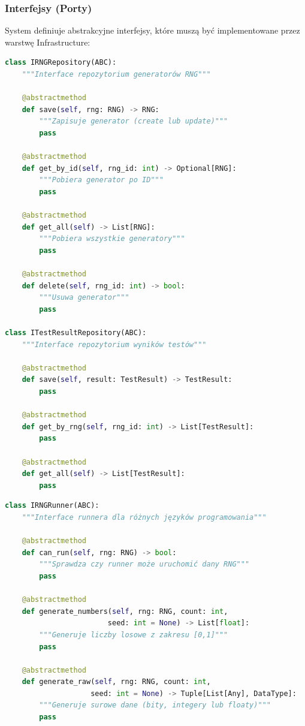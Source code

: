 \documentclass[12pt,a4paper]{article}
\begin{document}
\subsubsection{Interfejsy (Porty)}

System definiuje abstrakcyjne interfejsy, które muszą być implementowane przez warstwę Infrastructure:

\begin{lstlisting}[language=Python, caption=Interfejsy repozytoriów]
class IRNGRepository(ABC):
    """Interface repozytorium generatorów RNG"""

    @abstractmethod
    def save(self, rng: RNG) -> RNG:
        """Zapisuje generator (create lub update)"""
        pass

    @abstractmethod
    def get_by_id(self, rng_id: int) -> Optional[RNG]:
        """Pobiera generator po ID"""
        pass

    @abstractmethod
    def get_all(self) -> List[RNG]:
        """Pobiera wszystkie generatory"""
        pass

    @abstractmethod
    def delete(self, rng_id: int) -> bool:
        """Usuwa generator"""
        pass

class ITestResultRepository(ABC):
    """Interface repozytorium wyników testów"""

    @abstractmethod
    def save(self, result: TestResult) -> TestResult:
        pass

    @abstractmethod
    def get_by_rng(self, rng_id: int) -> List[TestResult]:
        pass

    @abstractmethod
    def get_all(self) -> List[TestResult]:
        pass
\end{lstlisting}

\begin{lstlisting}[language=Python, caption=Interface runnera]
class IRNGRunner(ABC):
    """Interface runnera dla różnych języków programowania"""

    @abstractmethod
    def can_run(self, rng: RNG) -> bool:
        """Sprawdza czy runner może uruchomić dany RNG"""
        pass

    @abstractmethod
    def generate_numbers(self, rng: RNG, count: int,
                        seed: int = None) -> List[float]:
        """Generuje liczby losowe z zakresu [0,1]"""
        pass

    @abstractmethod
    def generate_raw(self, rng: RNG, count: int,
                    seed: int = None) -> Tuple[List[Any], DataType]:
        """Generuje surowe dane (bity, integery lub floaty)"""
        pass
\end{lstlisting}
\end{document}
